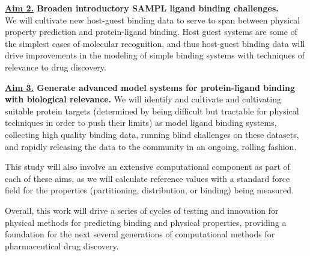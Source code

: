 \documentclass[11pt]{article}
\begin{document}
{\bf \underline{Aim 2.} Broaden introductory SAMPL ligand binding challenges.}\\
We will cultivate new host-guest binding data to serve to span between physical property prediction and protein-ligand binding. 
Host guest systems are some of the simplest cases of molecular recognition, and thus host-guest binding data will drive improvements in the modeling of simple binding systems with techniques of relevance to drug discovery.

{\bf \underline{Aim 3.} Generate advanced model systems for protein-ligand binding with biological relevance.}
We will identify and cultivate and cultivating suitable protein targets (determined by being difficult but tractable for physical techniques in order to push their limits) as model ligand binding systems, collecting high quality binding data, running blind challenges on these datasets, and rapidly releasing the data to the community in an ongoing, rolling fashion.


This study will also involve an extensive computational component as part of each of these aims, as we will calculate reference values with a standard force field for the properties (partitioning, distribution, or binding) being measured. 

Overall, this work will drive a series of cycles of testing and innovation for physical methods for predicting binding and physical properties, providing a foundation for the next several generations of computational methods for pharmaceutical drug discovery. 
\end{document}
